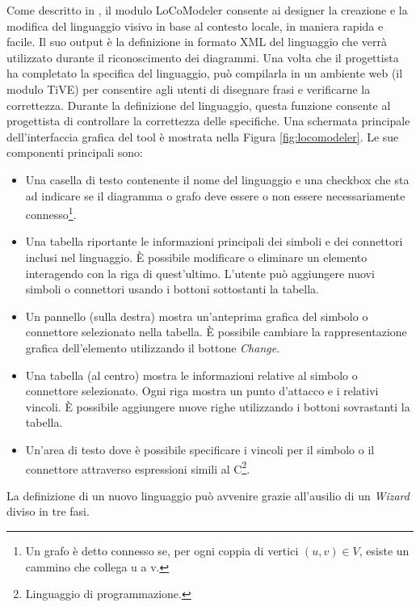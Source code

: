             Come descritto in \cite{extending_localcontext}, il modulo LoCoModeler consente ai designer la creazione e la modifica del linguaggio visivo in base al contesto locale, in maniera rapida e facile. Il suo output è la definizione in formato XML del linguaggio che verrà utilizzato durante il riconoscimento dei diagrammi. Una volta che il progettista ha completato la specifica del linguaggio, può compilarla in un ambiente web (il modulo TiVE) per consentire agli utenti di disegnare frasi e verificarne la correttezza. Durante la definizione del linguaggio, questa funzione consente al progettista di controllare la correttezza delle specifiche.
            \newline
            Una schermata principale dell'interfaccia grafica del tool è mostrata nella Figura \ref{fig:locomodeler}. Le sue componenti principali sono:
            \begin{itemize}
                \item Una casella di testo contenente il nome del linguaggio e una checkbox che sta ad indicare se il diagramma o grafo deve essere o non essere necessariamente connesso\footnote{Un grafo è detto connesso se, per ogni coppia di vertici $(u, v)\in{V}$, esiste un cammino che collega u a v.}.
                \item Una tabella riportante le informazioni principali dei simboli e dei connettori inclusi nel linguaggio. È possibile modificare o eliminare un elemento interagendo con la riga di quest'ultimo. L'utente può aggiungere nuovi simboli o connettori usando i bottoni sottostanti la tabella.
                \item Un pannello (sulla destra) mostra un'anteprima grafica del simbolo o connettore selezionato nella tabella. È possibile cambiare la rappresentazione grafica dell'elemento utilizzando il bottone \textit{Change}.
                \item Una tabella (al centro) mostra le informazioni relative al simbolo o connettore selezionato. Ogni riga mostra un punto d'attacco e i relativi vincoli. È possibile aggiungere nuove righe utilizzando i bottoni sovrastanti la tabella.
                \item Un'area di testo dove è possibile specificare i vincoli per il simbolo o il connettore attraverso espressioni simili al C\footnote{Linguaggio di programmazione.}.
            \end{itemize}
            La definizione di un nuovo linguaggio può avvenire grazie all'ausilio di un \textit{Wizard} diviso in tre fasi.

